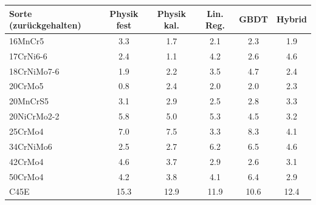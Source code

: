 \begin{tabular}{@{}lS[table-format=2.1]S[table-format=2.1]S[table-format=2.1]S[table-format=2.1]S[table-format=2.1]@{}}
\toprule
Sorte (zurückgehalten) & {Physik fest} & {Physik kal.} & {Lin. Reg.} & {GBDT} & {Hybrid} \\
\midrule
16MnCr5 & 3.3 & 1.7 & 2.1 & 2.3 & 1.9 \\
17CrNi6-6 & 2.4 & 1.1 & 4.2 & 2.6 & 4.6 \\
18CrNiMo7-6 & 1.9 & 2.2 & 3.5 & 4.7 & 2.4 \\
20CrMo5 & 0.8 & 2.4 & 2.0 & 2.0 & 2.3 \\
20MnCrS5 & 3.1 & 2.9 & 2.5 & 2.8 & 3.3 \\
20NiCrMo2-2 & 5.8 & 5.0 & 5.3 & 4.5 & 3.2 \\
25CrMo4 & 7.0 & 7.5 & 3.3 & 8.3 & 4.1 \\
34CrNiMo6 & 2.5 & 2.7 & 6.2 & 6.5 & 4.6 \\
42CrMo4 & 4.6 & 3.7 & 2.9 & 2.6 & 3.1 \\
50CrMo4 & 4.2 & 3.8 & 4.1 & 6.4 & 2.9 \\
C45E & 15.3 & 12.9 & 11.9 & 10.6 & 12.4 \\
\bottomrule
\end{tabular}

